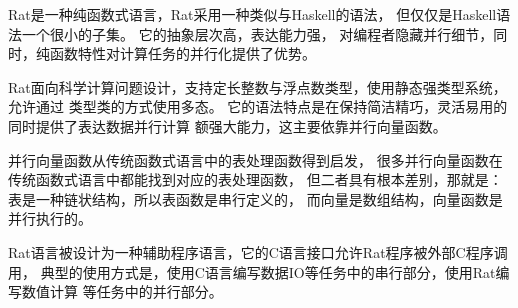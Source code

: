 Rat是一种纯函数式语言，Rat采用一种类似与Haskell的语法，
但仅仅是Haskell语法一个很小的子集。
它的抽象层次高，表达能力强，
对编程者隐藏并行细节，同时，纯函数特性对计算任务的并行化提供了优势。

Rat面向科学计算问题设计，支持定长整数与浮点数类型，使用静态强类型系统，允许通过
类型类的方式使用多态。
它的语法特点是在保持简洁精巧，灵活易用的同时提供了表达数据并行计算
额强大能力，这主要依靠并行向量函数。

并行向量函数从传统函数式语言中的表处理函数得到启发，
很多并行向量函数在传统函数式语言中都能找到对应的表处理函数，
但二者具有根本差别，那就是：表是一种链状结构，所以表函数是串行定义的，
而向量是数组结构，向量函数是并行执行的。

Rat语言被设计为一种辅助程序语言，它的C语言接口允许Rat程序被外部C程序调用，
典型的使用方式是，使用C语言编写数据IO等任务中的串行部分，使用Rat编写数值计算
等任务中的并行部分。
